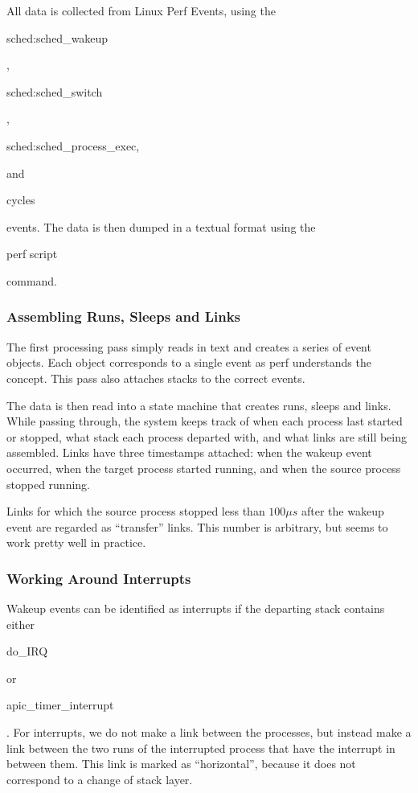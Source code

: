 \documentclass[10pt]{article}
\begin{document}

All data is collected from Linux Perf Events, using the \\ \begin{tt}sched:sched\_wakeup\end{tt}, \begin{tt}sched:sched\_switch\end{tt}, \\ \begin{tt}sched:sched\_process\_exec,\end{tt} and \begin{tt}cycles\end{tt} events.  The data is then dumped in a textual format using the \begin{tt}perf script\end{tt} command.


\subsubsection{Assembling Runs, Sleeps and Links}

The first processing pass simply reads in text and creates a series of event objects.  Each object corresponds to a single event as perf understands the concept.  This pass also attaches stacks to the correct events.

The data is then read into a  state machine that creates runs, sleeps and links.  While passing through, the system keeps track of when each process last started or stopped, what stack each process departed with, and what links are still being assembled.  Links have three timestamps attached: when the wakeup event occurred, when the target process started running, and when the source process stopped running.

Links for which the source process stopped less than $100\mu s$ after the wakeup event are regarded as ``transfer'' links.  This number is arbitrary, but seems to work pretty well in practice.

\subsubsection{Working Around Interrupts}

Wakeup events can be identified as interrupts if the departing stack contains either \begin{tt}do\_IRQ\end{tt} or \begin{tt}apic\_timer\_interrupt\end{tt}.  For interrupts, we do not make a link between the processes, but instead make a link between the two runs of the interrupted process that have the interrupt in between them.  This link is marked as ``horizontal'', because it does not correspond to a change of stack layer.
\end{document}
